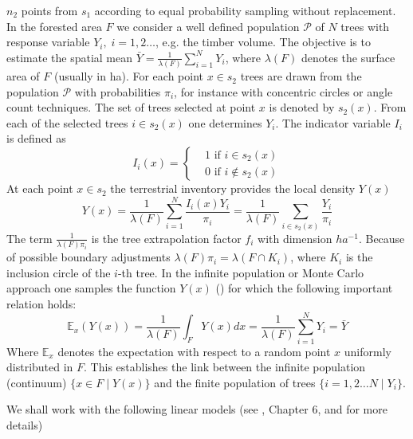 \documentclass[a4paper,12pt,leqno, titlepage]{article}
\newcommand{\EX}{\mathbb{E}}
\begin{document}
$n_2$ points from $s_1$ according to equal probability
sampling without replacement. In the forested area $F$ we consider a well defined population $ \mathcal{P}$ of $N$ trees with response variable
 $Y_i,\;i=1,2 \ldots$, e.g. the timber volume.  The objective is to estimate the spatial mean  $\bar{Y}=\frac{1}{\lambda(F)}\sum_{i=1}^NY_i$, where $\lambda(F)$ denotes the surface area of $F$ (usually in ha). For each point $x\in{s_2}$ trees are drawn from the population $\mathcal{P}$ with probabilities $\pi_i$, for instance with concentric circles or angle count techniques. The
set of trees selected at point $x$ is denoted by $s_{2}(x)$. From each of the
selected trees $i\in{s_{2}(x)}$ one determines $Y_i$. The indicator variable $I_i$ is defined as
\begin{equation}\label{1stage}
 I_i(x)=\begin{cases}&1 \text{ if $i\in s_{2}(x)$}\\
                      &0 \text{ if $i\not\in s_{2}(x)$}
         \end{cases}
\end{equation}
At each point $x\in{s_2}$ the
terrestrial inventory provides the local density $Y(x)$
\begin{equation}\label{truelocaldensity}
 Y(x) =\frac{1}{\lambda(F)}\sum_{i=1}^N \frac{I_i(x)Y_i}{\pi_i}=\frac{1}{\lambda(F)}\sum_{i\in{s}_2(x)} \frac{Y_i}{\pi_i}
 \end{equation}
 The term $\frac{1}{\lambda(F)\pi_i}$ is the tree extrapolation factor $f_i$ with dimension $ha^{-1}$. Because of possible boundary adjustments $\lambda(F)\pi_i=\lambda(F \cap K_i)$, where $K_i$ is the inclusion circle of the $i$-th tree. In the infinite population or Monte Carlo approach one samples the function $Y(x)$ (\cite{mandallaz}) for which the following important relation holds:
 \begin{equation}\label{montecarlo}
 \EX_{x} (Y(x))=\frac{1}{\lambda(F)}\int_{F} Y(x)dx=\frac{1}{\lambda(F)}\sum_{i=1}^NY_i=\bar{Y}
 \end{equation}
 Where $\EX_x$ denotes the expectation with respect to a random point $x$ uniformly distributed in $F$. This establishes the link between the infinite population (continuum) $\{x\in{F} \mid Y(x)\}$ and the finite population of trees $\{i=1,2 \ldots N \mid Y_i\}$.\par
 We shall work with the following linear models (see \cite{mandallaz}, Chapter 6, and \cite{mandallazreport1} for more details)
\end{document}
